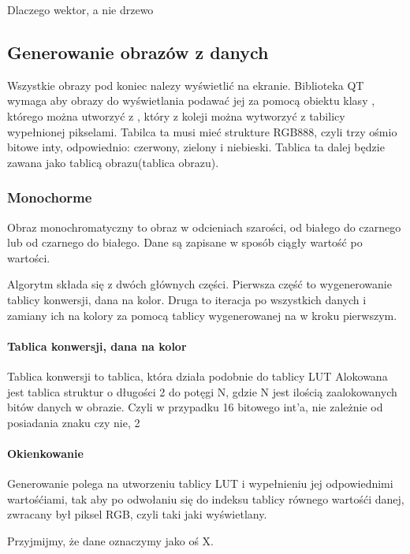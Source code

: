 Dlaczego wektor, a nie drzewo

\subsection{Generowanie obrazów z danych}

Wszystkie obrazy pod koniec nalezy wyświetlić na ekranie. 
Biblioteka QT wymaga aby obrazy do wyświetlania podawać jej za pomocą obiektu klasy , którego można utworzyć z , który z koleji można wytworzyć z tabilicy wypełnionej pikselami.
Tabilca ta musi mieć strukture RGB888, czyli trzy ośmio bitowe inty, odpowiednio: czerwony, zielony i niebieski.
Tablica ta dalej będzie zawana jako tablicą obrazu(tablica obrazu).

\subsubsection{Monochorme}

Obraz monochromatyczny to obraz w odcieniach szarości, od białego do czarnego lub od czarnego do białego. Dane są zapisane w sposób ciągły wartość po wartości.


Algorytm składa się z dwóch głównych części.
Pierwsza część to wygenerowanie tablicy konwersji, dana na kolor.
Druga to iteracja po wszystkich danych i zamiany ich na kolory za pomocą tablicy wygenerowanej na w kroku pierwszym.


\paragraph{Tablica konwersji, dana na kolor}

Tablica konwersji to tablica, która działa podobnie do tablicy LUT
Alokowana jest tablica struktur  o długości 2 do potęgi N, gdzie N jest ilością zaalokowanych bitów danych w obrazie.
Czyli w przypadku 16 bitowego int'a, nie zależnie od posiadania znaku czy nie, 2

\paragraph{Okienkowanie}

Generowanie polega na utworzeniu tablicy LUT i wypełnieniu jej odpowiednimi wartośćiami, tak aby po odwołaniu się do indeksu tablicy równego wartośći danej, zwracany był piksel RGB, czyli taki jaki wyświetlany.

Przyjmijmy, że dane oznaczymy jako oś X.


